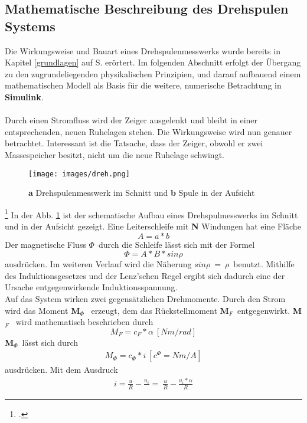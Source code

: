 \documentclass[12pt,a4paper]{scrartcl}	%
\begin{document}
\subsection{Mathematische Beschreibung des Drehspulen Systems}
Die Wirkungsweise und Bauart eines Drehspulenmesswerks wurde bereits in Kapitel \ref{grundlagen} auf S. \pageref{grundlagen} erörtert. Im folgenden Abschnitt erfolgt der Übergang zu den zugrundeliegenden physikalischen Prinzipien, und darauf aufbauend einem mathematischen Modell als Basis für die weitere, numerische Betrachtung in \textbf{Simulink}.\\
\\
Durch einen Stromfluss wird der Zeiger ausgelenkt und bleibt in einer entsprechenden, neuen Ruhelagen stehen. Die Wirkungsweise wird nun genauer betrachtet. Interessant ist die Tatsache, dass der Zeiger, obwohl er zwei Massespeicher besitzt, nicht um die neue Ruhelage schwingt.
\begin{figure}[htb]
	\centering
	\texttt{[image: images/dreh.png]}
	\caption[\textbf{a}  Drehspulenmesswerk im Schnitt und \textbf{b}  Spule in der Aufsicht]{\textbf{a} Drehspulenmesswerk im Schnitt und \textbf{b}  Spule in der Aufsicht\footnotemark }
	\label{schnitt}
\end{figure}
\footcitetext[vgl.][S. 263]{lehr}
In der Abb. \ref{schnitt} ist der schematische Aufbau eines Drehspulmesswerks im Schnitt und in der Aufsicht gezeigt. Eine Leiterschleife mit \textbf{N} Windungen hat eine Fläche
\[ A = a*b \]
Der magnetische Fluss $\Phi$~durch die Schleife lässt sich mit der Formel
\[ \Phi = A*B*sin\rho \]
ausdrücken. Im weiteren Verlauf wird die Näherung $sin\rho~=~\rho$~benutzt. Mithilfe des Induktionsgesetzes und der Lenz'schen Regel ergibt sich dadurch eine der Ursache entgegenwirkende Induktionsspannung.  \\
Auf das System wirken zwei gegensätzlichen Drehmomente. Durch den Strom wird das Moment \textbf{M$_{\Phi}$}~ erzeugt, dem das Rückstellmoment \textbf{M$_{F}$}~entgegenwirkt.
\textbf{M$_{F}$}~ wird mathematisch beschrieben durch
\begin{equation}
M_{F} = c_{F} * \alpha~[Nm/rad]
\end{equation}
\textbf{M$_{\Phi}$}~lässt sich durch 
\begin{align}
M_{\Phi} = c_{\Phi}*i~[c^{\Phi} = Nm/A]
\end{align}
ausdrücken. Mit dem Ausdruck
\begin{align}
i 		= \frac{u}{R} - \frac{u_{i}}~=~ \frac{u}{R} - \frac{u_{i}*\alpha}{R}
\end{align}
\end{document}
